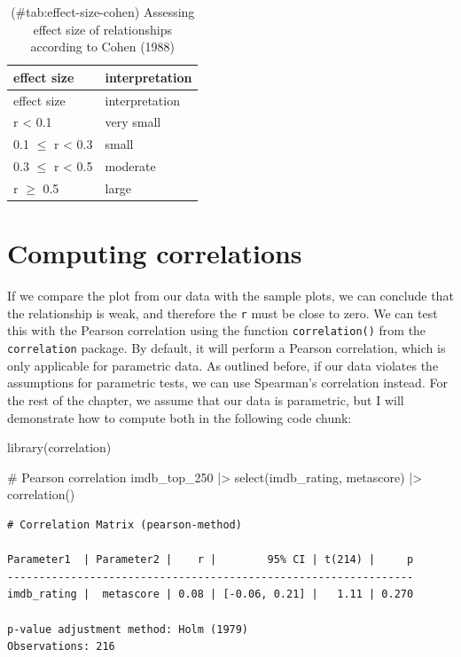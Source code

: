 \documentclass[
  letterpaper,
]{krantz}
\makeatletter
\newenvironment{Shaded}{\begin{snugshade}}{\end{snugshade}}
\newcommand{\CommentTok}[1]{\textcolor[rgb]{0.37,0.37,0.37}{#1}}
\newcommand{\FunctionTok}[1]{\textcolor[rgb]{0.28,0.35,0.67}{#1}}
\newcommand{\NormalTok}[1]{\textcolor[rgb]{0.00,0.23,0.31}{#1}}
\newcommand{\SpecialCharTok}[1]{\textcolor[rgb]{0.37,0.37,0.37}{#1}}
\newenvironment{kframe}{%
\medskip{}
\setlength{\fboxsep}{.8em}
 \def\at@end@of@kframe{}%
 \ifinner\ifhmode%
  \def\at@end@of@kframe{\end{minipage}}%
  \begin{minipage}{\columnwidth}%
 \fi\fi%
 \def\FrameCommand##1{\hskip\@totalleftmargin \hskip-\fboxsep
 \colorbox{shadecolor}{##1}\hskip-\fboxsep
     \hskip-\linewidth \hskip-\@totalleftmargin \hskip\columnwidth}%
 \MakeFramed {\advance\hsize-\width
   \@totalleftmargin\z@ \linewidth\hsize
   \@setminipage}}%
 {\par\unskip\endMakeFramed%
 \at@end@of@kframe}
\renewenvironment{Shaded}{\begin{kframe}}{\end{kframe}}
\makeatother
\begin{document}
\begin{longtable}[]{@{}ll@{}}
\caption{(\#tab:effect-size-cohen) Assessing effect size of
relationships according to Cohen (1988)}\tabularnewline
\toprule\noalign{}
effect size & interpretation \\
\midrule\noalign{}
\endfirsthead
\toprule\noalign{}
effect size & interpretation \\
\midrule\noalign{}
\endhead
\bottomrule\noalign{}
\endlastfoot
r \textless{} 0.1 & very small \\
0.1 \(\leq\) r \textless{} 0.3 & small \\
0.3 \(\leq\) r \textless{} 0.5 & moderate \\
r \(\geq\) 0.5 & large \\
\end{longtable}

\section{Computing correlations}\label{sec-computing-correlations}

If we compare the plot from our data with the sample plots, we can
conclude that the relationship is weak, and therefore the \texttt{r}
must be close to zero. We can test this with the Pearson correlation
using the function \texttt{correlation()} from the \texttt{correlation}
package. By default, it will perform a Pearson correlation, which is
only applicable for parametric data. As outlined before, if our data
violates the assumptions for parametric tests, we can use Spearman's
correlation instead. For the rest of the chapter, we assume that our
data is parametric, but I will demonstrate how to compute both in the
following code chunk:

\begin{Shaded}
\begin{Highlighting}[]
\FunctionTok{library}\NormalTok{(correlation)}

\CommentTok{\# Pearson correlation}
\NormalTok{imdb\_top\_250 }\SpecialCharTok{|\textgreater{}}
  \FunctionTok{select}\NormalTok{(imdb\_rating, metascore) }\SpecialCharTok{|\textgreater{}}
  \FunctionTok{correlation}\NormalTok{()}
\end{Highlighting}
\end{Shaded}

\begin{verbatim}
# Correlation Matrix (pearson-method)

Parameter1  | Parameter2 |    r |        95% CI | t(214) |     p
----------------------------------------------------------------
imdb_rating |  metascore | 0.08 | [-0.06, 0.21] |   1.11 | 0.270

p-value adjustment method: Holm (1979)
Observations: 216
\end{verbatim}
\end{document}
